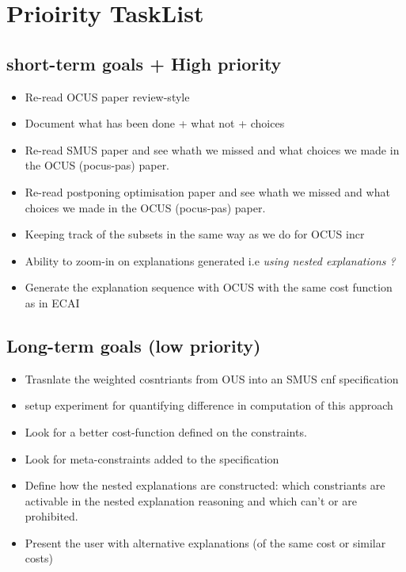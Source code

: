 \documentclass{article}
\newcommand\comment[1]{\marginpar{\tiny #1}}
\renewcommand\comment[1]{#1}
\newcommand{\todo}[1]{{\comment{\color{blue}#1}}}
\begin{document}

\section{Prioirity TaskList}
\subsection{short-term goals + High priority}
\begin{itemize}
  \item \todo{Re-read OCUS paper review-style}
  \item \todo{Document what has been done + what not + choices}
  \item \todo{Re-read SMUS paper and see whath we missed and what choices we made in the OCUS (pocus-pas) paper.} 
  \item \todo{Re-read postponing optimisation paper and see whath we missed and what choices we made in the OCUS (pocus-pas) paper.}
  \item \todo{Keeping track of the subsets in the same way as we do for OCUS incr}
  \item \todo{Ability to zoom-in on explanations generated i.e \textit{using nested explanations ?}}
  \item \todo{Generate the explanation sequence with OCUS with the same cost function as in ECAI}
\end{itemize}
\subsection{Long-term goals (low priority)}
\begin{itemize}
  \item \todo{Trasnlate the weighted cosntriants from OUS into an SMUS cnf specification}
  \item \todo{setup experiment for quantifying difference in computation of this approach}
  \item \todo{Look for a better cost-function defined on the constraints.}
  \item \todo{Look for meta-constraints added to the specification}
  \item \todo{Define how the nested explanations are constructed: which constriants are activable in the nested explanation reasoning and which can't or are prohibited.}
  \item \todo{Present the user with alternative explanations (of the same cost or similar costs)}
\end{itemize}
\end{document}
